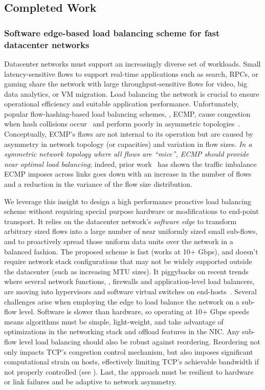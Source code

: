 \subsection{Completed Work}
\subsubsection{Software edge-based load balancing scheme for fast datacenter networks}
Datacenter networks must support an increasingly diverse set of
workloads. Small latency-sensitive flows to support real-time applications such
as search, RPCs, or gaming share the network with large
throughput-sensitive flows for video, big data analytics, or VM
migration. Load balancing the network is crucial to ensure operational efficiency
and suitable application performance.
Unfortunately, popular flow-hashing-based load balancing schemes,
\eg{}, ECMP, cause congestion when hash collisions
occur~\cite{al2010hedera,dc-mptcp,rasley2014planck,zats2012detail,packetspray,cao2013drb} and
perform poorly in asymmetric topologies~\cite{alizadeh2014conga,zhou2014wcmp}.
Conceptually, ECMP's flaws are not internal to its operation but are caused by 
asymmetry in network topology (or capacities) and variation in flow sizes. 
{\em In a symmetric network topology
where all flows are ``mice'', ECMP should provide near optimal load balancing}; 
indeed, prior work~\cite{alizadeh2014conga,flowlet} has shown the traffic imbalance 
ECMP imposes across links goes down with an increase in the number of flows and 
a reduction in the variance of the flow size distribution.

We leverage this insight to design a high performance proactive load balancing 
scheme without requiring 
special purpose hardware or modifications to end-point transport.
It relies on the datacenter network's {\em software edge} to 
transform arbitrary sized flows into a large number of near uniformly sized small sub-flows, 
and to proactively spread those uniform data units over the network in a balanced fashion. 
The proposed scheme is fast (works at 10+ Gbps), and doesn't require network stack 
configurations that 
may not be widely supported outside the datacenter (such as increasing MTU sizes). 
It piggybacks on recent trends where several network functions, \eg{}, 
firewalls and application-level load balancers, are moving into hypervisors and 
software virtual switches on end-hosts~\cite{koponen2014network,pfaff2015design,pfaff2009extending}. 
Several challenges arise when employing the edge to load balance the network
on a sub-flow level. Software is slower than hardware, so operating at 10+ Gbps speeds means
algorithms must be simple, light-weight, and take advantage of optimizations in
the networking stack and offload features in the NIC. Any sub-flow level load balancing should also be
robust against reordering.
Reordering not only impacts TCP's congestion control mechanism, 
but also imposes significant computational
strain on hosts, effectively limiting TCP's achievable bandwidth if not properly 
controlled (see ).
Last, the approach must be resilient to hardware or link failures and be adaptive to network asymmetry.

